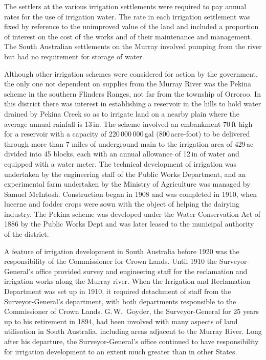 The settlers at the various irrigation settlements were required to
pay annual rates for the use of irrigation water.  The rate in each
irrigation settlement was fixed by reference to the unimproved value
of the land and included a proportion of interest on the cost of the
works and of their maintenance and management.  The South Australian
settlements on the Murray involved pumping from the river but had no
requirement for storage of water.

Although other irrigation schemes were considered for action by the
government, the only one not dependent on supplies from the Murray
River was the Pekina scheme in the southern Flinders Ranges, not far
from the township of Orroroo.  In this district there was interest in
establishing a reservoir in the hills to hold water drained by Pekina
Creek so as to irrigate land on a nearby plain where the average
annual rainfall is 13\,in.  The scheme involved an embankment 70\,ft
high for a reservoir with a capacity of 220\,000\,000\,gal
(800\,acre-foot) to be delivered through more than 7 miles of
underground main to the irrigation area of 429\,ac divided into 45
blocks, each with an annual allowance of 12\,in of water and equipped
with a water meter.  The technical development of irrigation was
undertaken by the engineering staff of the Public Works Department,
and an experimental farm undertaken by the Ministry of Agriculture was
managed by Samuel McIntosh.  Construction began in 1908 and was
completed in 1910, when lucerne and fodder crops were sown with the
object of helping the dairying industry.  The Pekina scheme was
developed under the Water Conservation Act of 1886 by the Public Works
Dept and was later leased to the municipal authority of the
district.

A feature of irrigation development in South Australia before 1920 was
the responsibility of the Commissioner for Crown Lands.  Until 1910
the Surveyor-General's office provided survey and engineering staff
for the reclamation and irrigation works along the Murray river.  When
the Irrigation and Reclamation Department was set up in 1910, it
required detachment of staff from the Surveyor-General's department,
with both departments responsible to the Commissioner of Crown Lands.
G.\,W.~Goyder, the Surveyor-General for 25 years up to his retirement
in 1894, had been involved with many aspects of land utilisation in
South Australia, including areas adjacent to the Murray River.  Long
after his departure, the Surveyor-General's office continued to have
responsibility for irrigation development to an extent much greater
than in other States.

